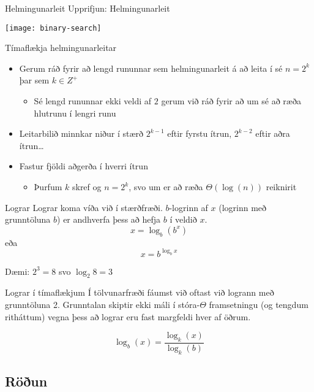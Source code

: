 \documentclass[handout]{beamer}
\begin{document}
\begin{frame}{Helmingunarleit}
Upprifjun: Helmingunarleit

\begin{center}
\texttt{[image: binary-search]}
\end{center}
\end{frame}

\begin{frame}{Tímaflækja helmingunarleitar}
\begin{itemize}
 \item Gerum ráð fyrir að lengd rununnar sem helmingunarleit á að leita í sé $n = 2^k$ þar sem $k \in Z^+$
 \begin{itemize}
  \item Sé lengd rununnar ekki veldi af $2$ gerum við ráð fyrir að um sé að ræða hlutrunu í lengri runu 
 \end{itemize}
 \item Leitarbilið minnkar niður í stærð $2^{k-1}$ eftir fyrstu ítrun, $2^{k-2}$ eftir aðra ítrun\ldots
 \item Fastur fjöldi aðgerða í hverri ítrun \pause
 \begin{itemize}
  \item Þurfum $k$ skref og $n = 2^k$, svo um er að ræða $\Theta(\log(n))$ reiknirit
 \end{itemize}
\end{itemize}
\end{frame}

\begin{frame}{Lograr}
    Lograr koma víða við í stærðfræði. $b$-logrinn af $x$ (logrinn með grunntöluna $b$) er andhverfa þess að hefja $b$ í veldið $x$.
    \[
        x = \log_b(b^x)
    \]
    eða
    \[
        x = b^{\log_b x}
    \]
    
    \vspace{0.5cm}
    Dæmi: $2^3 = 8$ svo $\log_2 8 = 3$
\end{frame}

\begin{frame}{Lograr í tímaflækjum}
Í tölvunarfræði fáumst við oftast við logrann með grunntöluna 2. Grunntalan skiptir ekki máli í stóra-$\Theta$ framsetningu (og tengdum ritháttum) vegna þess að lograr eru fast margfeldi hver af öðrum.

\[
 \log_b(x) = \frac{\log_k(x)}{\log_k(b)}
\]

\end{frame}

\subsection{Röðun}
\end{document}
